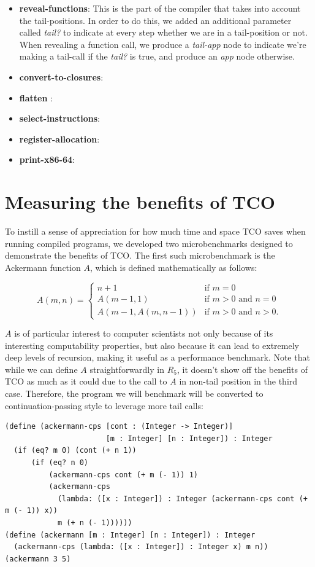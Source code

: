 \documentclass[12pt]{article}
\begin{document}
\begin{itemize}
\item \textbf{reveal-functions}: This is the part of the compiler that
  takes into account the tail-positions. In order to do this, we added
  an additional parameter called \emph{tail?} to indicate at every
  step whether we are in a tail-position or not. When revealing a
  function call, we produce a \emph{tail-app} node to indicate we're
  making a tail-call if the \emph{tail?} is true, and produce an
  \emph{app} node otherwise.
\item \textbf{convert-to-closures}:
\item \textbf{flatten} :
\item \textbf{select-instructions}:
\item \textbf{register-allocation}:
\item \textbf{print-x86-64}:
\end{itemize}

\section{Measuring the benefits of TCO}

To instill a sense of appreciation for how much time and space TCO saves when running
compiled programs, we developed two microbenchmarks designed to demonstrate the benefits
of TCO. The first such microbenchmark is the Ackermann function $A$, which is defined
mathematically as follows:

$$
A(m, n) = \begin{cases}
  n+1               & \mbox{if } m = 0 \\
  A(m-1, 1)         & \mbox{if } m > 0 \mbox{ and } n = 0 \\
  A(m-1, A(m, n-1)) & \mbox{if } m > 0 \mbox{ and } n > 0.
\end{cases}
$$

$A$ is of particular interest to computer scientists not only
because of its interesting computability properties, but also because it can lead
to extremely deep levels of recursion, making it useful as a performance benchmark.
Note that while we can define $A$ straightforwardly in $R_5$, it doesn't show off
the benefits of TCO as much as it could due to the call to $A$ in non-tail position
in the third case. Therefore, the program we will benchmark will be converted
to continuation-passing style to leverage more tail calls:

\begin{verbatim}
(define (ackermann-cps [cont : (Integer -> Integer)]
                       [m : Integer] [n : Integer]) : Integer
  (if (eq? m 0) (cont (+ n 1))
      (if (eq? n 0)
          (ackermann-cps cont (+ m (- 1)) 1)
          (ackermann-cps
            (lambda: ([x : Integer]) : Integer (ackermann-cps cont (+ m (- 1)) x))
            m (+ n (- 1))))))
(define (ackermann [m : Integer] [n : Integer]) : Integer
  (ackermann-cps (lambda: ([x : Integer]) : Integer x) m n))
(ackermann 3 5)
\end{verbatim}
\end{document}
